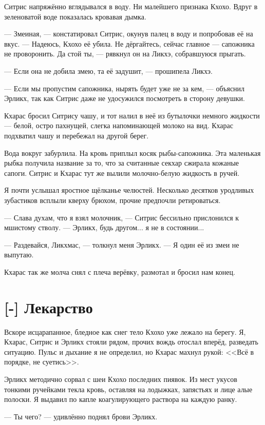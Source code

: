Ситрис напряжённо вглядывался в воду.
Ни малейшего признака Кхохо.
Вдруг в зеленоватой воде показалась кровавая дымка.

--- Змеиная, --- констатировал Ситрис, окунув палец в воду и попробовав её на вкус.
--- Надеюсь, Кхохо её убила.
Не дёргайтесь, сейчас главное --- сапожника не проворонить.
Да стой ты, --- рявкнул он на Ликхэ, собравшуюся прыгать.

--- Если она не добила змею, та её задушит, --- прошипела Ликхэ.

--- Если мы пропустим сапожника, нырять будет уже не за кем, --- объяснил Эрликх, так как Ситрис даже не удосужился посмотреть в сторону девушки.

Кхарас бросил Ситрису чашу, и тот налил в неё из бутылочки немного жидкости --- белой, остро пахнущей, слегка напоминающей молоко на вид.
Кхарас подхватил чашу и перебежал на другой берег.

Вода вокруг забурлила.
На кровь приплыл косяк рыбы-сапожника.
Эта маленькая рыбка получила название за то, что за считанные секхар сжирала кожаные сапоги.
Ситрис и Кхарас тут же вылили молочно-белую жидкость в ручей.

Я почти услышал яростное щёлканье челюстей.
Несколько десятков уродливых зубастиков всплыли кверху брюхом, прочие предпочли ретироваться.

--- Слава духам, что я взял молочник, --- Ситрис бессильно прислонился к мшистому стволу.
--- Эрликх, будь другом... я не в состоянии...

--- Раздевайся, Ликхмас, --- толкнул меня Эрликх.
--- Я один её из змеи не выпутаю.

Кхарас так же молча снял с плеча верёвку, размотал и бросил нам конец.

\section{[-] Лекарство}

Вскоре исцарапанное, бледное как снег тело Кхохо уже лежало на берегу.
Я, Кхарас, Ситрис и Эрликх стояли рядом, прочих вождь отослал вперёд, разведать ситуацию.
Пульс и дыхание я не определил, но Кхарас махнул рукой: <<Всё в порядке, не суетись>>.

Эрликх методично сорвал с шеи Кхохо последних пиявок.
Из мест укусов тонкими ручейками текла кровь, оставляя на лодыжках, запястьях и лице алые полоски.
Я выдавил по капле коагулирующего раствора на каждую ранку.

--- Ты чего? --- удивлённо поднял брови Эрликх.

